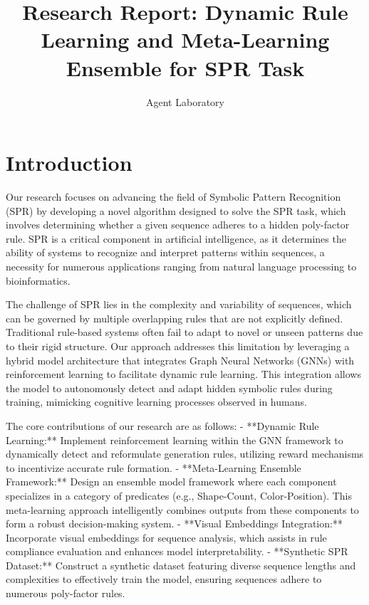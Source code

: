 \documentclass{article}
\title{Research Report: Dynamic Rule Learning and Meta-Learning Ensemble for SPR Task}
\author{Agent Laboratory}
\begin{document}
\maketitle

\begin{abstract}

\end{abstract}

\section{Introduction}
Our research focuses on advancing the field of Symbolic Pattern Recognition (SPR) by developing a novel algorithm designed to solve the SPR task, which involves determining whether a given sequence adheres to a hidden poly-factor rule. SPR is a critical component in artificial intelligence, as it determines the ability of systems to recognize and interpret patterns within sequences, a necessity for numerous applications ranging from natural language processing to bioinformatics.

The challenge of SPR lies in the complexity and variability of sequences, which can be governed by multiple overlapping rules that are not explicitly defined. Traditional rule-based systems often fail to adapt to novel or unseen patterns due to their rigid structure. Our approach addresses this limitation by leveraging a hybrid model architecture that integrates Graph Neural Networks (GNNs) with reinforcement learning to facilitate dynamic rule learning. This integration allows the model to autonomously detect and adapt hidden symbolic rules during training, mimicking cognitive learning processes observed in humans.

The core contributions of our research are as follows:
- **Dynamic Rule Learning:** Implement reinforcement learning within the GNN framework to dynamically detect and reformulate generation rules, utilizing reward mechanisms to incentivize accurate rule formation.
- **Meta-Learning Ensemble Framework:** Design an ensemble model framework where each component specializes in a category of predicates (e.g., Shape-Count, Color-Position). This meta-learning approach intelligently combines outputs from these components to form a robust decision-making system.
- **Visual Embeddings Integration:** Incorporate visual embeddings for sequence analysis, which assists in rule compliance evaluation and enhances model interpretability.
- **Synthetic SPR Dataset:** Construct a synthetic dataset featuring diverse sequence lengths and complexities to effectively train the model, ensuring sequences adhere to numerous poly-factor rules.
\end{document}
